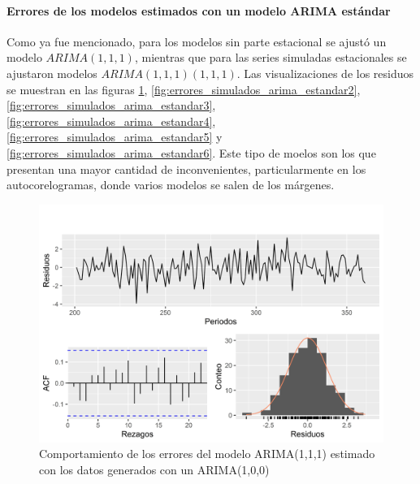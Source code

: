 \documentclass[
]{article}
\begin{document}
\paragraph{Errores de los modelos estimados con un modelo ARIMA estándar}

Como ya fue mencionado, para los modelos sin parte estacional se ajustó
un modelo \(ARIMA(1,1,1)\), mientras que para las series simuladas
estacionales se ajustaron modelos \(ARIMA(1,1,1)(1,1,1)\). Las
visualizaciones de los residuos se muestran en las figuras
\ref{fig:errores_simulados_arima_estandar1},
\ref{fig:errores_simulados_arima_estandar2},
\ref{fig:errores_simulados_arima_estandar3},
\ref{fig:errores_simulados_arima_estandar4},
\ref{fig:errores_simulados_arima_estandar5} y
\ref{fig:errores_simulados_arima_estandar6}. Este tipo de moelos son los
que presentan una mayor cantidad de inconvenientes, particularmente en
los autocorelogramas, donde varios modelos se salen de los márgenes.

\begin{figure}[H]
\includegraphics[width=1\linewidth,height=1\textheight]{Tesis_files/figure-latex/errores_simulados_arima_estandar1-1} \caption{Comportamiento de los errores del modelo ARIMA(1,1,1) estimado con los datos generados con un ARIMA(1,0,0)}\label{fig:errores_simulados_arima_estandar1}
\end{figure}
\end{document}
